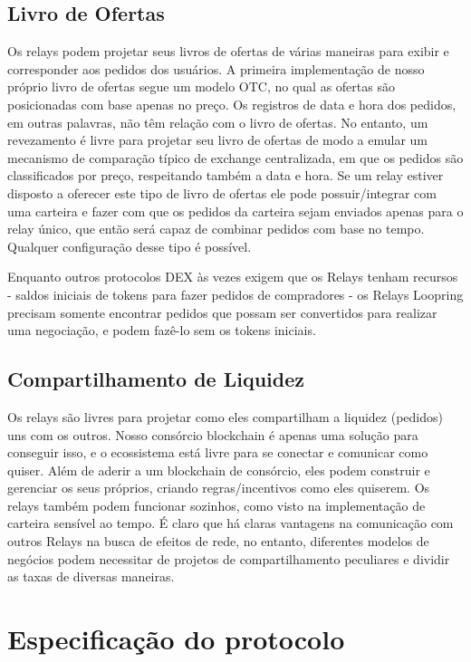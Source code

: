 \documentclass[UTF8,nofonts]{article}
\begin{document}
\begin{multicols}{2}
\subsection{Livro de Ofertas\label{sec:order_book}}
Os relays podem projetar seus livros de ofertas de várias maneiras para exibir e corresponder aos pedidos dos usuários. A primeira implementação de nosso próprio livro de ofertas segue um modelo OTC, no qual as ofertas são posicionadas com base apenas no preço. Os registros de data e hora dos pedidos, em outras palavras, não têm relação com o livro de ofertas.
No entanto, um revezamento é livre para projetar seu livro de ofertas de modo a emular um mecanismo de comparação típico de exchange centralizada, em que os pedidos são classificados por preço, respeitando também a data e hora. Se um relay estiver disposto a oferecer este tipo de livro de ofertas ele pode possuir/integrar com uma carteira e fazer com que os pedidos da carteira sejam enviados apenas para o relay único, que então será capaz de combinar pedidos com base no tempo. Qualquer configuração desse tipo é possível.


Enquanto outros protocolos DEX às vezes exigem que os Relays tenham recursos - saldos iniciais de tokens para fazer pedidos de compradores - os Relays Loopring precisam somente encontrar pedidos que possam ser convertidos para realizar uma negociação, e podem fazê-lo sem os tokens iniciais.

\subsection{Compartilhamento de Liquidez\label{sec:liquidity_sharing}}
Os relays são livres para projetar como eles compartilham a liquidez (pedidos) uns com os outros. Nosso consórcio blockchain é apenas uma solução para conseguir isso, e o ecossistema está livre para se conectar e comunicar como quiser. Além de aderir a um blockchain de consórcio, eles podem construir e gerenciar os seus próprios, criando regras/incentivos como eles quiserem. Os relays também podem funcionar sozinhos, como visto na implementação de carteira sensível ao tempo. É claro que há claras vantagens na comunicação com outros Relays na busca de efeitos de rede, no entanto, diferentes modelos de negócios podem necessitar de projetos de compartilhamento peculiares e dividir as taxas de diversas maneiras.


\section{Especificação do protocolo\label{sec:protocol}}


\end{multicols}
\end{document}
